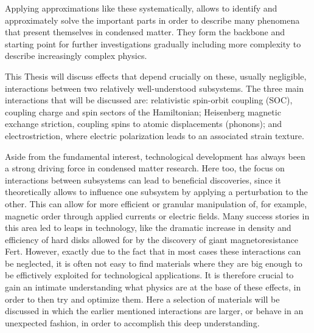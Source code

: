 Applying approximations like these systematically, allows to identify and approximately solve the important parts in order to describe many phenomena that present themselves in condensed matter.
They form the backbone and starting point for further investigations gradually including more complexity to describe increasingly complex physics.

This Thesis will discuss effects that depend crucially on these, usually negligible, interactions between two relatively well-understood subsystems.
The three main interactions that will be discussed are: relativistic spin-orbit coupling (SOC), coupling charge and spin sectors of the Hamiltonian; Heisenberg magnetic exchange striction, coupling spins to atomic displacements (phonons); and electrostriction, where electric polarization leads to an associated strain texture.

Aside from the fundamental interest, technological development has always been a strong driving force in condensed matter research. Here too, the focus on interactions between subsystems can lead to beneficial discoveries, since it theoretically allows to influence one subsystem by applying a perturbation to the other.
This can allow for more efficient or granular manipulation of, for example, magnetic order through applied currents or electric fields.
Many success stories in this area led to leaps in technology, like the dramatic increase in density and efficiency of hard disks allowed for by the discovery of giant magnetoresistance Fert.
However, exactly due to the fact that in most cases these interactions can be neglected, it is often not easy to find materials where they are big enough to be effictively exploited for technological applications.
It is therefore crucial to gain an intimate understanding what physics are at the base of these effects, in order to then try and optimize them.
Here a selection of materials will be discussed in which the earlier mentioned interactions are larger, or behave in an unexpected fashion, in order to accomplish this deep understanding.

